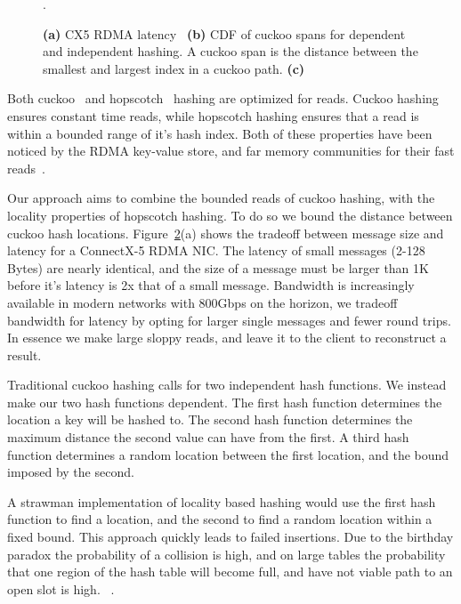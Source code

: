 \begin{figure}[t]
\begin{subfigure}{0.3\linewidth}
        \label{fig:tbd}
    \end{subfigure}.
    \vspace{-1em}
    \caption{
    \textbf{(a)} CX5 RDMA latency~\cite{rdma-latency}
    \textbf{(b)} CDF of cuckoo spans for dependent and independent hashing. A cuckoo span is the distance between the smallest and largest index in a cuckoo path.
    \textbf{(c)} 
    }
    \label{fig:rdma}

\end{figure}


Both cuckoo~\cite{cuckoo} and hopscotch~\cite{hopscotch}
hashing are optimized for reads. Cuckoo hashing ensures
constant time reads, while hopscotch hashing ensures that a
read is within a bounded range of it's hash index. Both of
these properties have been noticed by the RDMA key-value
store, and far memory communities for their fast
reads~\cite{memc3,cuckoo-improvements,pilaf,farm}.

Our approach aims to combine the bounded reads of cuckoo
hashing, with the locality properties of hopscotch hashing.
To do so we bound the distance between cuckoo hash
locations. Figure~\ref{fig:rdma}(a) shows the tradeoff
between message size and latency for a ConnectX-5 RDMA NIC.
The latency of small messages (2-128 Bytes) are nearly
identical, and the size of a message must be larger than 1K
before it's latency is 2x that of a small message. Bandwidth
is increasingly available in modern networks with 800Gbps on
the horizon, we tradeoff bandwidth for latency by opting for
larger single messages and fewer round trips. In essence we
make large sloppy reads, and leave it to the client to
reconstruct a result.

Traditional cuckoo hashing calls for
two independent hash functions. We instead make our two hash
functions dependent. The first hash function determines the
location a key will be hashed to. The second hash function
determines the maximum distance the second value can have
from the first. A third hash function determines a random
location between the first location, and the bound imposed
by the second.

A strawman implementation of locality based hashing would
use the first hash function to find a location, and the
second to find a random location within a fixed bound. This
approach quickly leads to failed insertions. Due to the
birthday paradox the probability of a collision is high, and
on large tables the probability that one region of the hash
table will become full, and have not viable path to an open
slot is high. ~.

